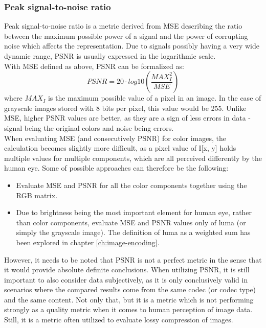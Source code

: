 \documentclass[thesis=M,english]{FITthesis}[2012/10/20]
\begin{document}
\subsubsection{Peak signal-to-noise ratio}
Peak signal-to-noise ratio is a metric derived from MSE describing the ratio
between the maximum possible power of a signal and the power of corrupting
noise which affects the representation. Due to signals possibly having
a very wide dynamic range, PSNR is usually expressed in the logarithmic scale.
\\

With MSE defined as above, PSNR can be formalized as:
\begin{equation}
    PSNR = 20 \cdot log10 \left( \frac{MAX^2_I}{MSE} \right)
\end{equation}
where $MAX_I$ is the maximum possible value of a pixel in an image. In the
case of grayscale images stored with 8 bits per pixel, this value would
be 255. Unlike MSE, higher PSNR values are better, as they are a sign of less errors
in data - signal being the original colors and noise being errors.
\\

When evaluating MSE (and consecutively PSNR) for color images, the calculation becomes
slightly more difficult, as a pixel value of I[x, y] holds multiple values for multiple
components, which are all perceived differently by the human eye. Some of possible approaches
can therefore be the following:
\begin{itemize}
  \item Evaluate MSE and PSNR for all the color components together using the RGB matrix.
  \item Due to brightness being the most important element for human eye, rather than
  color components, evaluate MSE and PSNR values only of luma (or simply the grayscale
  image). The definition of luma as a weighted sum has been explored in chapter \ref{ch:image-encoding}.
\end{itemize}
\cite{matlab18}\cite{netpbm}


However, it needs to be noted that PSNR is not a perfect metric in the sense
that it would provide absolute definite conclusions. When utilizing PSNR, it is
still important to also consider data subjectively, as it is only conclusively
valid in scenarios where the compared results come from the same codec (or codec
type) and the same content. Not only that, but it is a metric which is not
performing strongly as a quality metric when it comes to human perception
of image data.\cite{psnrvalid} Still, it is a metric often
utilized to evaluate lossy compression
of images.
\end{document}
